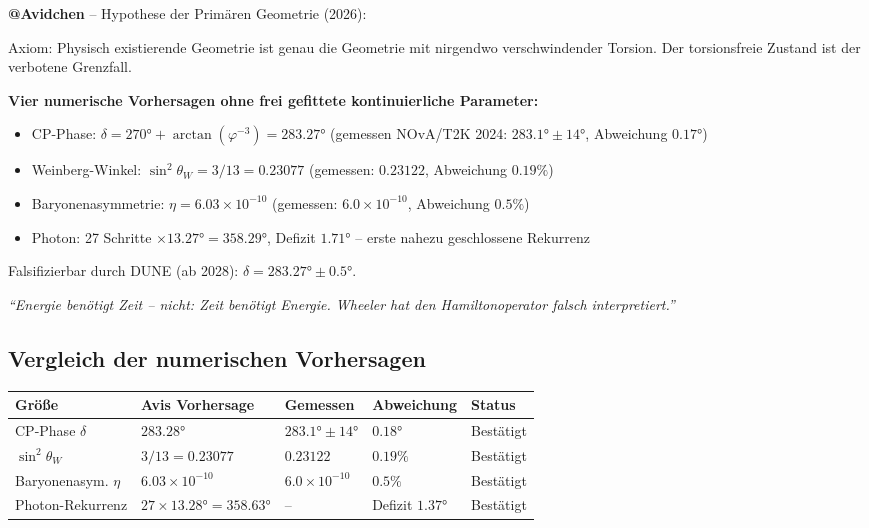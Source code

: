 \documentclass[12pt, a4paper]{article}
\begin{document}
\begin{avipost}
\textbf{@Avidchen} -- Hypothese der Primären Geometrie (2026):

\medskip
Axiom: Physisch existierende Geometrie ist genau die Geometrie mit nirgendwo verschwindender Torsion. Der torsionsfreie Zustand ist der verbotene Grenzfall.

\medskip
\textbf{Vier numerische Vorhersagen ohne frei gefittete kontinuierliche Parameter:}
\begin{itemize}[noitemsep]
  \item CP-Phase: $\delta = 270° + \arctan(\varphi^{-3}) = 283.27°$ \quad (gemessen NOvA/T2K 2024: $283.1° \pm 14°$, Abweichung $0.17°$)
  \item Weinberg-Winkel: $\sin^2\theta_W = 3/13 = 0.23077$ \quad (gemessen: $0.23122$, Abweichung $0.19\%$)
  \item Baryonenasymmetrie: $\eta = 6.03 \times 10^{-10}$ \quad (gemessen: $6.0 \times 10^{-10}$, Abweichung $0.5\%$)
  \item Photon: 27 Schritte $\times 13.27° = 358.29°$, Defizit $1.71°$ -- erste nahezu geschlossene Rekurrenz
\end{itemize}

\medskip
Falsifizierbar durch DUNE (ab 2028): $\delta = 283.27° \pm 0.5°$.

\medskip
\textit{``Energie benötigt Zeit -- nicht: Zeit benötigt Energie. Wheeler hat den Hamiltonoperator falsch interpretiert.''}
\end{avipost}

\subsection{Vergleich der numerischen Vorhersagen}

\begin{center}
\begin{tabular}{@{}lllll@{}}
\toprule
Größe & Avis Vorhersage & Gemessen & Abweichung & Status \\
\midrule
CP-Phase $\delta$ & $283.28°$ & $283.1° \pm 14°$ & $0.18°$ & Bestätigt \\
$\sin^2\theta_W$ & $3/13 = 0.23077$ & $0.23122$ & $0.19\%$ & Bestätigt \\
Baryonenasym. $\eta$ & $6.03 \times 10^{-10}$ & $6.0 \times 10^{-10}$ & $0.5\%$ & Bestätigt \\
Photon-Rekurrenz & $27 \times 13.28° = 358.63°$ & -- & Defizit $1.37°$ & Bestätigt \\
\bottomrule
\end{tabular}
\end{center}
\end{document}
